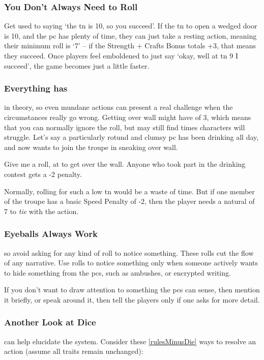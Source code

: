 \begin{multicols}{2}
\subsubsection{You Don't Always Need to Roll}

Get used to saying `the \gls{tn} is 10, so you succeed'.
If the \gls{tn} to open a wedged door is 10, and the \gls{pc} has plenty of time, they can just take a resting action, meaning their minimum roll is `7' -- if the Strength + Crafts Bonus totals +3, that means they succeed.
Once players feel emboldened to just say `okay, well at \gls{tn} 9 I succeed', the game becomes just a little faster.

\subsubsection{Everything has }
in theory, so even mundane actions can present a real challenge when the circumstances really go wrong.
Getting over  wall might have  of 3, which means that you can normally ignore the roll, but may still find times characters will struggle.
Let's say a particularly rotund and clumsy \gls{pc} has been drinking all day, and now wants to join the troupe in sneaking over  wall.

\begin{speechtext}
  Give me a  roll, at \tn[3] to get over the wall.
  Anyone who took part in the drinking contest gets a -2 penalty.
\end{speechtext}

Normally, rolling for such a low \gls{tn} would be a waste of time.
But if one member of the troupe has a basic Speed Penalty of -2, then the player needs a \gls{natural} of 7 to \emph{tie} with the action.

\subsubsection{Eyeballs Always Work}
so avoid asking for any kind of roll to notice something.
These rolls cut the flow of any narrative.
Use rolls to notice something only when someone actively wants to hide something from the \glspl{pc}, such as ambushes, or encrypted writing.

If you don't want to draw attention to something the \glspl{pc} can sense, then mention it briefly, or speak around it, then tell the players only if one asks for more detail.

\subsubsection{Another Look at Dice}
can help elucidate the system.
Consider these \ref{rulesMinusDie} ways to resolve an action (assume all \glspl{trait} remain unchanged):


\end{multicols}
